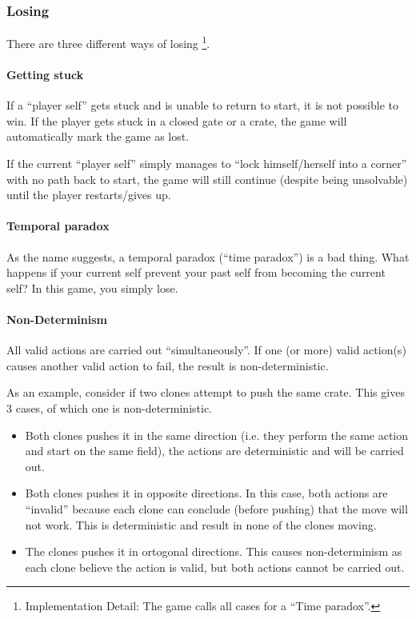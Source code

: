 
\subsubsection{Losing}

There are three different ways of losing
\footnote{Implementation Detail: The game calls all cases for a ``Time paradox''.}.

\paragraph{Getting stuck}
If a ``player self'' gets stuck and is unable to return to start, it
is not possible to win.  If the player gets stuck in a closed gate or
a crate, the game will automatically mark the game as lost.

If the current ``player self'' simply manages to ``lock
himself/herself into a corner'' with no path back to start, the game
will still continue (despite being unsolvable) until the player
restarts/gives up.

\paragraph{Temporal paradox}
\label{temporal-paradox}
As the name suggests, a temporal paradox (``time paradox'') is a bad
thing.  What happens if your current self prevent your past self from
becoming the current self?  In this game, you simply lose.

\paragraph{Non-Determinism}
All valid actions are carried out ``simultaneously''.  If one (or
more) valid action(s) causes another valid action to fail, the result
is non-deterministic.

As an example, consider if two clones attempt to push the same
crate.  This gives 3 cases, of which one is non-deterministic.

\begin{itemize}
\item Both clones pushes it in the same direction (i.e. they perform
  the same action and start on the same field), the actions are
  deterministic and will be carried out.
\item Both clones pushes it in opposite directions.  In this case,
  both actions are ``invalid'' because each clone can conclude (before
  pushing) that the move will not work.  This is deterministic and
  result in none of the clones moving.
\item The clones pushes it in ortogonal directions.  This causes
  non-determinism as each clone believe the action is valid, but
  both actions cannot be carried out.
\end{itemize}

